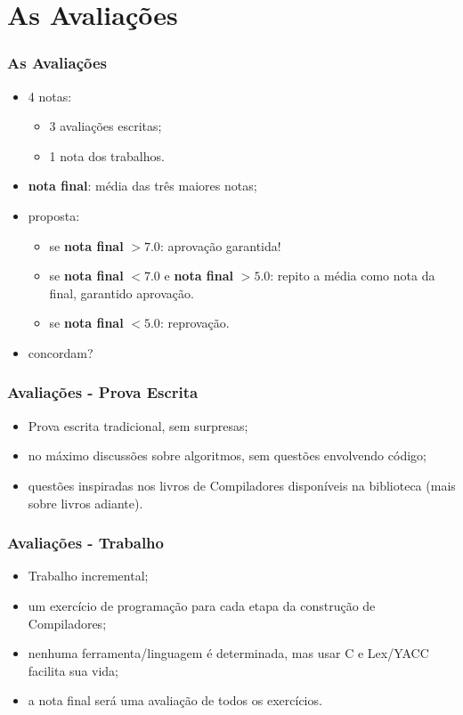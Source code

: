 \documentclass[table]{beamer}
\begin{document}
\section{As Avaliações}
\begin{frame}
   \frametitle{As Avaliações}
   \begin{itemize}
      \item 4 notas:
      \begin{itemize}
         \item 3 avaliações escritas;
	 \item 1 nota dos trabalhos.
      \end{itemize}
      \item \textbf{nota final}: média das três maiores notas;
      \item proposta:
      \begin{itemize}
         \item se \textbf{nota final} $> 7.0$: aprovação garantida!
	 \item se \textbf{nota final} $< 7.0$ e \textbf{nota final} $> 5.0$: repito a média como nota da final, garantido aprovação.
	 \item se \textbf{nota final} $< 5.0$: reprovação.
      \end{itemize}
      \item concordam?
   \end{itemize}
\end{frame}

\begin{frame}
   \frametitle{Avaliações - Prova Escrita}
   \begin{itemize}
      \item Prova escrita tradicional, sem surpresas;
      \item no máximo discussões sobre algoritmos, sem questões envolvendo código;
      \item questões inspiradas nos livros de Compiladores disponíveis na biblioteca (mais sobre livros adiante).
   \end{itemize}
\end{frame}

\begin{frame}
   \frametitle{Avaliações - Trabalho}
   \begin{itemize}
      \item Trabalho incremental;
      \item um exercício de programação para cada etapa da construção de Compiladores;
      \item nenhuma ferramenta/linguagem é determinada, mas usar C e Lex/YACC facilita sua vida;
      \item a nota final será uma avaliação de todos os exercícios.
   \end{itemize}
\end{frame}
\end{document}
